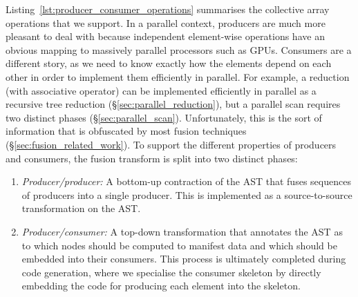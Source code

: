 Listing~\ref{lst:producer_consumer_operations} summarises the collective array operations that we
support. In a parallel context, producers are much more pleasant to deal with
because independent element-wise operations have an obvious mapping to massively
parallel processors such as GPUs. Consumers are
a different story, as we need to know exactly how the elements depend on each
other in order to implement them efficiently in parallel. For example, a
reduction (with associative operator) can be implemented efficiently in
parallel as a recursive tree reduction (\S\ref{sec:parallel_reduction}), but a
parallel scan requires two distinct phases (\S\ref{sec:parallel_scan}).
Unfortunately, this is the sort of information that is obfuscated by most fusion
techniques (\S\ref{sec:fusion_related_work}). To support the different
properties of producers and consumers, the fusion transform is split into two
distinct phases:
%
\begin{enumerate}
    \item \emph{Producer/producer:} A bottom-up contraction of the AST that
        fuses sequences of producers into a single producer. This is implemented
        as a source-to-source transformation on the AST\@.

    \item \emph{Producer/consumer:} A top-down transformation that annotates the
        AST as to which nodes should be computed to manifest data and which
        should be embedded into their consumers. This process is ultimately
        completed during code generation, where we specialise the consumer
        skeleton by directly embedding the code for producing each element into
        the skeleton.

\end{enumerate}

